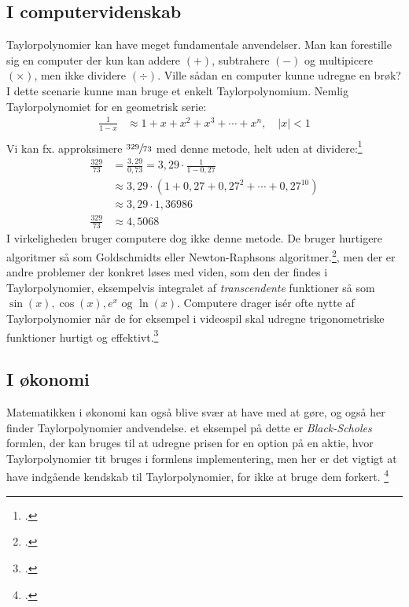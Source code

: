 \documentclass[12pt, a4paper]{article}
\begin{document}
\begin{refsection}
\subsection{I computervidenskab}
Taylorpolynomier kan have meget fundamentale anvendelser. Man kan forestille sig en computer der kun kan addere $(+)$, subtrahere $(-)$ og multipicere $(\times)$, men ikke dividere $(\div)$. Ville sådan en computer kunne udregne en brøk?\\
I dette scenarie kunne man bruge et enkelt Taylorpolynomium. Nemlig Taylorpolynomiet for en geometrisk serie:
\begin{equation*}
    \begin{aligned}
        \frac{1}{1-x}&\approx 1+x+x^2+x^3+\cdots+x^n, \quad |x|<1\\
    \end{aligned}
\end{equation*}
Vi kan fx. approksimere $\sfrac{329}{73}$ med denne metode, helt uden at dividere:\footcite[s. 646]{calculuswithanalyticgeometry}\\
\begin{equation*}
    \begin{aligned}
        \frac{329}{73}&=\frac{3{,}29}{0{,}73}=3{,}29\cdot\frac{1}{1-0{,}27}\\
                      &\approx 3{,}29\cdot\left(1+0{,}27+0{,}27^2+\cdots+0{,}27^{10}\right)\\
                      &\approx3{,}29\cdot1{,}36986\\
        \frac{329}{73}&\approx 4{,}5068
    \end{aligned}
\end{equation*}
I virkeligheden bruger computere dog ikke denne metode. De bruger hurtigere algoritmer så som Goldschmidts eller Newton-Raphsons algoritmer.\footcite{division}, men der er andre problemer der konkret løses med viden, som den der findes i Taylorpolynomier, eksempelvis integralet af \textit{transcendente} funktioner så som $\sin(x), \cos(x), e^x \text{ og } \ln(x)$. Computere drager isér ofte nytte af Taylorpolynomier når de for eksempel i videospil skal udregne trigonometriske funktioner hurtigt og effektivt.\footcite[11]{hvadermatematik}
\subsection{I økonomi}
Matematikken i økonomi kan også blive svær at have med at gøre, og også her finder Taylorpolynomier andvendelse. et eksempel på dette er \textit{Black-Scholes} formlen, der kan bruges til at udregne prisen for en option på en aktie, hvor Taylorpolynomier tit bruges i formlens implementering, men her er det vigtigt at have indgående kendskab til Taylorpolynomier, for ikke at bruge dem forkert. \footcite{aktier}

\end{refsection}
\end{document}
